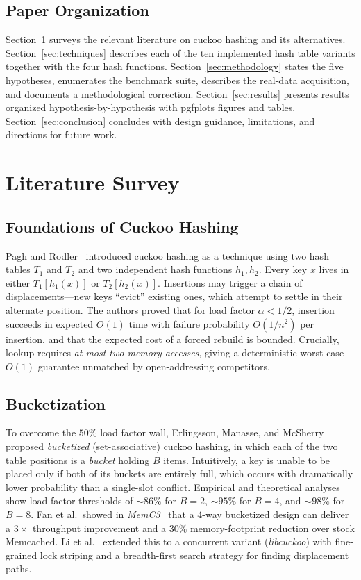 \documentclass[10pt,journal,compsoc]{IEEEtran}
\begin{document}
\subsection{Paper Organization}
Section~\ref{sec:litreview} surveys the relevant literature on cuckoo hashing and its alternatives. Section~\ref{sec:techniques} describes each of the ten implemented hash table variants together with the four hash functions. Section~\ref{sec:methodology} states the five hypotheses, enumerates the benchmark suite, describes the real-data acquisition, and documents a methodological correction. Section~\ref{sec:results} presents results organized hypothesis-by-hypothesis with pgfplots figures and tables. Section~\ref{sec:conclusion} concludes with design guidance, limitations, and directions for future work.

\section{Literature Survey}\label{sec:litreview}

\subsection{Foundations of Cuckoo Hashing}
Pagh and Rodler~\cite{pagh2004cuckoo} introduced cuckoo hashing as a technique using two hash tables $T_1$ and $T_2$ and two independent hash functions $h_1, h_2$. Every key $x$ lives in either $T_1[h_1(x)]$ or $T_2[h_2(x)]$. Insertions may trigger a chain of displacements---new keys ``evict'' existing ones, which attempt to settle in their alternate position. The authors proved that for load factor $\alpha < 1/2$, insertion succeeds in expected $O(1)$ time with failure probability $O(1/n^2)$ per insertion, and that the expected cost of a forced rebuild is bounded. Crucially, lookup requires \emph{at most two memory accesses}, giving a deterministic worst-case $O(1)$ guarantee unmatched by open-addressing competitors.

\subsection{Bucketization}
To overcome the $50\%$ load factor wall, Erlingsson, Manasse, and McSherry~\cite{erlingsson2006cool} proposed \emph{bucketized} (set-associative) cuckoo hashing, in which each of the two table positions is a \emph{bucket} holding $B$ items. Intuitively, a key is unable to be placed only if both of its buckets are entirely full, which occurs with dramatically lower probability than a single-slot conflict. Empirical and theoretical analyses show load factor thresholds of $\sim 86\%$ for $B=2$, $\sim 95\%$ for $B=4$, and $\sim 98\%$ for $B=8$. Fan et al.\ showed in \emph{MemC3}~\cite{fan2013memc3} that a 4-way bucketized design can deliver a $3\times$ throughput improvement and a $30\%$ memory-footprint reduction over stock Memcached. Li et al.~\cite{li2014libcuckoo} extended this to a concurrent variant (\emph{libcuckoo}) with fine-grained lock striping and a breadth-first search strategy for finding displacement paths.
\end{document}
